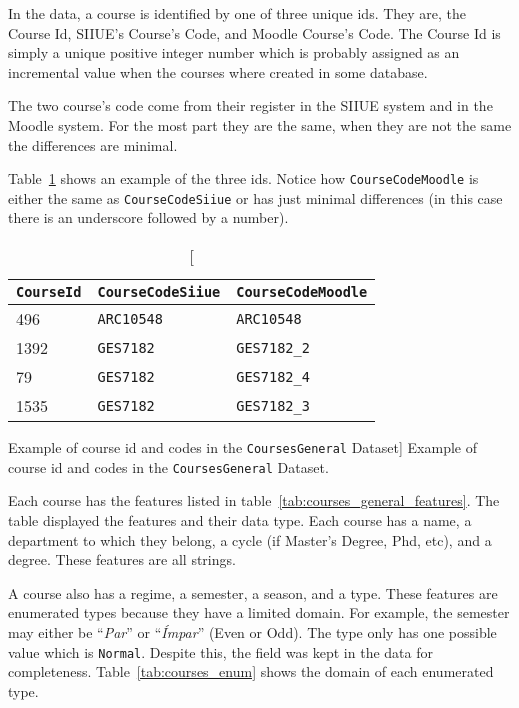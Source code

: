 In the data, a course is identified by one of three unique ids. They are, the
Course Id, SIIUE's Course's Code, and Moodle Course's Code. The Course Id is
simply a unique positive integer number which is probably assigned as an
incremental value when the courses where created in some database.

The two course's code come from their register in the SIIUE system and in the
Moodle system. For the most part they are the same, when they are not the same
the differences are minimal.

Table~\ref{tab:course_code_example} shows an example of the three ids. Notice
how \texttt{CourseCodeMoodle} is either the same as \texttt{CourseCodeSiiue} or
has just minimal differences (in this case there is an underscore followed by a
number).

\begin{table}[h!]
    \centering

    \begin{tabular}{l l l}
\texttt{CourseId} & \texttt{CourseCodeSiiue} & \texttt{CourseCodeMoodle} \\ \hline
        496       & \texttt{ARC10548}        & \texttt{ARC10548}         \\
        1392      & \texttt{GES7182}         & \texttt{GES7182\_2}       \\
        79        & \texttt{GES7182}         & \texttt{GES7182\_4}       \\
        1535      & \texttt{GES7182}         & \texttt{GES7182\_3}       \\
    \end{tabular}

    \caption
        [Example of course id and codes in the \texttt{CoursesGeneral} Dataset]
        {Example of course id and codes in the \texttt{CoursesGeneral} Dataset.}

    \label{tab:course_code_example}
\end{table}

Each course has the features listed in
table~\ref{tab:courses_general_features}. The table displayed the features and
their data type. Each course has a name, a department to which they belong, a
cycle (if Master's Degree, Phd, etc), and a degree. These features are all
strings.

A course also has a regime, a semester, a season, and a type. These features
are enumerated types because they have a limited domain. For example, the
semester may either be ``\textit{Par}'' or ``\textit{Ímpar}'' (Even or Odd).
The type only has one possible value which is \texttt{Normal}. Despite this,
the field was kept in the data for completeness. Table~\ref{tab:courses_enum}
shows the domain of each enumerated type.

